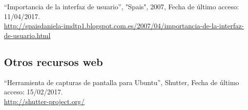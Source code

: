 ``Importancia de la interfaz de usuario'', "Spais", 2007, Fecha de último acceso: 11/04/2017.\\\href{http://spaisdaniela-imdtp1.blogspot.com.es/2007/04/importancia-de-la-interfaz-de-usuario.html}{http://spaisdaniela-imdtp1.blogspot.com.es/2007/04/importancia-de-la-interfaz-de-usuario.html}


\subsection{Otros recursos web}

``Herramienta de capturas de pantalla para Ubuntu'', Shutter, Fecha de último acceso: 15/02/2017.\\\href{http://shutter-project.org/}{http://shutter-project.org/}



